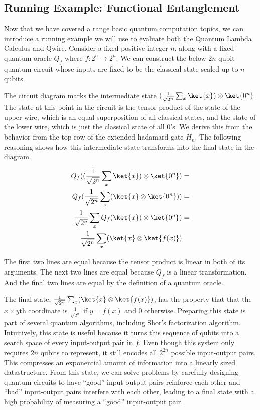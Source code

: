 \subsection{Running Example: Functional Entanglement}
\label{sec:fun_entangle}
Now that we have covered a range basic quantum computation topics, we can introduce a running example we will use to evaluate both the Quantum Lambda Calculus and Qwire. 
Consider a fixed positive integer $n$, along with a fixed quantum oracle $Q_f$ where $f : 2 ^ n \rightarrow 2 ^ n$. We can construct the below $2n$ qubit quantum circuit whose inputs are fixed to be the classical state  scaled up to $n$ qubits.



The circuit diagram marks the intermediate state $(\frac{1}{\sqrt{2^n}}\sum_x\ket{x})\otimes\ket{0^n}$.
The state at this point in the circuit is the tensor product of the state of the upper wire, which is an equal superposition of all classical states, and the state of the lower wire, which is just the classical state of all 0’s.
We derive this from the behavior from the top row of the extended hadamard gate $H_n$.
The following reasoning shows how this intermediate state transforms into the final state in the diagram.

\begin{align*}
Q_f ((\frac{1}{\sqrt{2^n}}\sum_x\ket{x})\otimes\ket{0^n}) &=\\
Q_f(\frac{1}{\sqrt{2^n}}\sum_x(\ket{x}\otimes\ket{0^n})) &=\\
\frac{1}{\sqrt{2^n}}\sum_xQ_f(\ket{x})\otimes\ket{0^n}) &=\\
\frac{1}{\sqrt{2^n}}\sum_x (\ket{x} \otimes\ket{f(x)})
\end{align*}

The first two lines are equal because the tensor product is linear in both of its arguments.
The next two lines are equal because $Q_f$ is a linear transformation.
And the final two lines are equal by the definition of a quantum oracle.

The final state, $\frac{1}{\sqrt{2^n}}\sum_x (\ket{x} \otimes\ket{f(x)})$, has the property that that the $x \times y$th coordinate is $\frac{1}{\sqrt{2^n}}$ if $y = f(x)$ and $0$ otherwise.
Preparing this state is part of several quantum algorithms, including Shor’s factorization algorithm.
Intuitively, this state is useful because it turns this sequence of qubits into a search space of every input-output pair in $f$.
Even though this system only requires $2n$ qubits to represent, it still encodes all $2^{2n}$ possible input-output pairs.
This compresses an exponential amount of information into a linearly sized datastructure.
From this state, we can solve problems by carefully designing quantum circuits to have “good” input-output pairs reinforce each other and “bad” input-output pairs interfere with each other, leading to a final state with a high probability of measuring a “good” input-output pair.